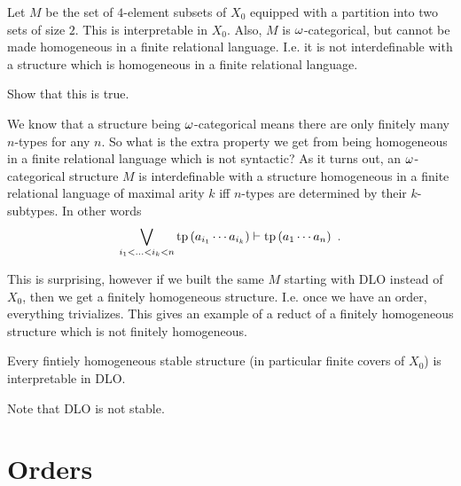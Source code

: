 \documentclass{amsart}
\begin{document}
\begin{exm}
Let $M$ be the set of $4$-element subsets of $X_0$ equipped with a partition into two
sets of size $2$.
This is interpretable in $X_0$.
Also, $M$ is $\omega$-categorical, but cannot be made homogeneous in a finite relational
language. I.e.
it is not interdefinable with a structure which is homogeneous in a finite relational
language.

\begin{exr}
Show that this is true.
\end{exr}

\begin{rmk}
We know that a structure being $\omega$-categorical means there are only finitely many $n$-types
for any $n$. So what is the extra property we get from being homogeneous in a finite
relational language which is not syntactic? As it turns out,
an $\omega$-categorical structure $M$ is interdefinable with a structure homogeneous in a
finite relational language of maximal arity $k$ iff $n$-types are determined by 
their $k$-subtypes. In other words
\begin{equation}
\bigvee_{i_1 < \ldots < i_k < n} \operatorname{tp}\left( a_{i_1} \cdots a_{i_k} \right)
\vdash
\operatorname{tp}\left( a_1 \cdots a_n \right) \ .
\end{equation}
\end{rmk} 

This is surprising, however if we built the same $M$ starting with DLO instead of $X_0$, 
then we get a finitely homogeneous structure. I.e. once we have an order, everything
trivializes.
This gives an example of a reduct of a finitely homogeneous structure which is not
finitely homogeneous.
\end{exm}

\begin{thm}[Lachlan]
Every fintiely homogeneous stable structure (in particular finite covers of $X_0$)
is interpretable in DLO.
\end{thm}

\begin{rmk}
Note that DLO is not stable.
\end{rmk}

\section{Orders}
\end{document}
